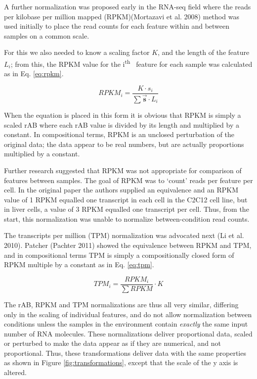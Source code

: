 \documentclass[onecolumn]{article}
\newcommand{\ith}[1]{ #1\textsuperscript{th}\ }
\newcommand{\vect}[1]{\vec{\textbf{#1}}}
\begin{document}
A further normalization was proposed early in the RNA-seq field where the reads per kilobase per million mapped (RPKM)(Mortazavi et al. 2008) method was used initially to place the read counts for each feature within and between samples on a common scale.

For this we also needed to know a scaling factor \(K\), and the length of the feature \(L_i\); from this, the RPKM value for the \ith{i} feature for each sample was calculated as in Eq. \ref{eq:rpkm}.

\begin{equation}
    RPKM_{i} = \frac{K \cdot s_{i} }{\sum{\vect{s}} \cdot L_{i}}
    \label{eq:rpkm}
\end{equation}

When the equation is placed in this form it is obvious that RPKM is simply a scaled rAB where each rAB value is divided by its length and multiplied by a constant. In compositional terms, RPKM is an unclosed perturbation of the original data; the data appear to be real numbers, but are actually proportions multiplied by a constant.

Further research suggested that RPKM was not appropriate for comparison of features between samples. The goal of RPKM was to `count' reads per feature per cell. In the original paper the authors supplied an equivalence and an RPKM value of 1 RPKM equalled one transcript in each cell in the C2C12 cell line, but in liver cells, a value of 3 RPKM equalled one transcript per cell. Thus, from the start, this normalization was unable to normalize between-condition read counts.

The transcripts per million (TPM) normalization was advocated next (Li et al. 2010). Patcher (Pachter 2011) showed the equivalence between RPKM and TPM, and in compositional terms TPM is simply a compositionally closed form of RPKM multiple by a constant as in Eq. \ref{eq:tpm}.

\begin{equation}
    TPM_{i} = \frac{RPKM_i}{\sum{RPKM}} \cdot K
    \label{eq:tpm}
\end{equation}

The rAB, RPKM and TPM normalizations are thus all very similar, differing only in the scaling of individual features, and do not allow normalization between conditions unless the samples in the environment contain \emph{exactly} the same input number of RNA molecules. These normalizations deliver proportional data, scaled or perturbed to make the data appear as if they are numerical, and not proportional. Thus, these transformations deliver data with the same properties as shown in Figure \ref{fig:transformations}, except that the scale of the y axis is altered.
\end{document}
